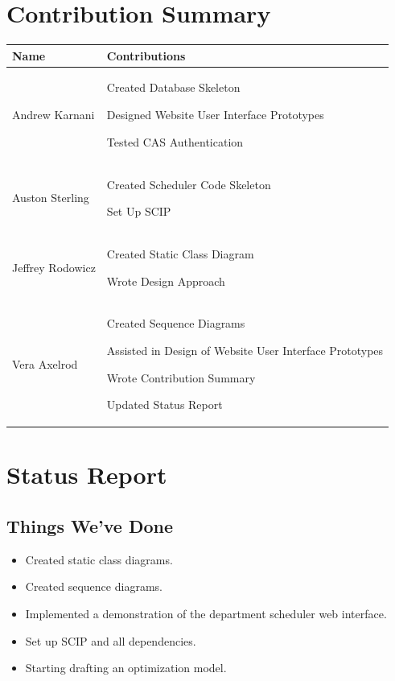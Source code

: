 \documentclass[11pt]{article}
\newenvironment{packed_itemize}{
\begin{itemize}
  \setlength{\itemsep}{1pt}
  \setlength{\parskip}{0pt}
  \setlength{\parsep}{0pt}
}{\end{itemize}}
\begin{document}
\section{Contribution Summary} %
\begin{tabular}{|m{1.4in}|m{4in}|}
\hline 
\textbf{\large Name}     & \textbf{\large Contributions} \\
\hline\hline

 Andrew Karnani
	&
	 \begin{packed_itemize}
		\item Created Database Skeleton
		\item Designed Website User Interface Prototypes
		\item Tested CAS Authentication
	\end{packed_itemize}
\\
\hline
 Auston Sterling
	&
	 \begin{packed_itemize}
	        \item Created Scheduler Code Skeleton
		  \item Set Up SCIP
	\end{packed_itemize}
\\
\hline
Jeffrey Rodowicz
	&
	 \begin{packed_itemize}
		\item Created Static Class Diagram
		\item Wrote Design Approach
	\end{packed_itemize}
\\
\hline
Vera Axelrod
	&
	 \begin{packed_itemize}
		\item Created Sequence Diagrams
		\item Assisted in Design of Website User Interface Prototypes
		\item Wrote Contribution Summary
		\item Updated Status Report
	\end{packed_itemize}
\\
\hline
\end{tabular}

\section*{Status Report} %
\subsection{Things We've Done}
\begin{itemize}
	\item Created static class diagrams.
	\item Created sequence diagrams.
	\item Implemented a demonstration of the department scheduler web interface.
	\item Set up SCIP and all dependencies.
	\item Starting drafting an optimization model. 
\end{itemize}
\end{document}
